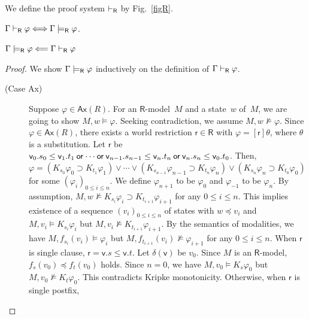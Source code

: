 \begin{definition}
 We define the proof system $\vdash_{\mathsf R}$ by Fig.~\ref{figR}.
\end{definition}

\begin{theorem}
 \label{sound-comp-nat-kripke}
 $\Gamma\vdash_{\mathsf R}\varphi\Longleftrightarrow\Gamma\models_{\mathsf R} \varphi$\enspace.
\end{theorem}
\begin{lemma}[Soundness]
 $\Gamma\models_{\mathsf R}\varphi\Longleftarrow\Gamma\vdash_{\mathsf R}\varphi$
\end{lemma}
\begin{proof}
We show $\Gamma\models_{\mathsf R}\varphi$ inductively
on the definition of $\Gamma\vdash_{\mathsf R}\varphi$.
\begin{description}
 \item[(Case {Ax})]
	    Suppose $\varphi\in \mathsf{Ax}(R)$.
	    For an $\mathsf{R}$-model~$M$ and a state~$w$ of~$M$,
	    we are going to show $M,w\models\varphi$.
	    Seeking contradiction,
	    we assume $M,w\not\models\varphi$.
	    Since $\varphi\in\mathsf{Ax}(R)$, there exists a world
	    restriction $\mathsf r\in\mathsf R$ with
	    $\varphi=[\mathsf r]\theta$,
	    where $\theta$ is a substitution.
	    Let $\mathsf r$ be
	    $\mathsf v_0.s_0\le\mathsf v_1.t_1\mathbin{\mathsf{or}}\cdots\mathbin{\mathsf{or}}
	    \mathsf v_{n-1}.s_{n-1}\le\mathsf v_n.t_n\mathbin{\mathsf{or}}\mathsf
	    v_n.s_n\le\mathsf v_0.t_0$.
	    Then,
	    $\varphi = (K_{s_0}\varphi_0\supset
	    K_{t_1}\varphi_1)\vee\cdots\vee
	    (K_{s_{n-1}}\varphi_{n-1}\supset K_{t_n}\varphi_n)
	    \vee (K_{s_n}\varphi_n\supset K_{t_0}\varphi_0)$
	    for some $(\varphi_i)_{0\le i\le n}$.
	    We define $\varphi_{n+1}$ to be $\varphi_0$ and
	    $\varphi_{-1}$ to be $\varphi_n$.
	    By assumption, $M,w\not\models K_{s_i}\varphi_i\supset
	    K_{t_{i+1}}\varphi_{i+1}$ for any $0\le i\le n$.
	    This implies existence of a sequence
	    $(v_i)_{0\le i\le n}$ of states with $w\preceq v_i$ and
	    $M,v_i\models K_{s_i}\varphi_i$ but $M,v_i\not\models
	    K_{t_{i+1}}\varphi_{i+1}$.
	    By the semantics of modalities, we have
	    $M,f_{s_i}(v_i)\models \varphi_i$ but $M,
	    f_{t_{i+1}}(v_i)\not\models\varphi_{i+1}$
	    for any $0\le i\le n$.
	    When $\mathsf r$ is single clause,
	    $\mathsf r = \mathsf v.s\le\mathsf v.t$.
	    Let $\delta(\mathsf v)$ be $v_0$.
	    Since $M$ is an $\mathsf R$-model,
	    $f_s(v_0)\preceq f_t(v_0)$ holds.
	    Since $n=0$,
	    we have $M,v_0\models K_s\varphi_0$ but $M,v_0\not\models
	    K_t\varphi_0$.
	    This contradicts Kripke monotonicity.
	    Otherwise, when $\mathsf r$ is single postfix,

\end{description}
\end{proof}
